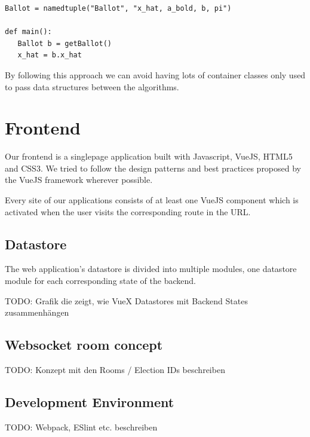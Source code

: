 \begin{verbatim}
Ballot = namedtuple("Ballot", "x_hat, a_bold, b, pi")

def main():
   Ballot b = getBallot()
   x_hat = b.x_hat
\end{verbatim}

By following this approach we can avoid having lots of container classes only used to pass data structures between the algorithms.

\section{Frontend}
Our frontend is a singlepage application built with Javascript, VueJS, HTML5 and CSS3. We tried to follow the design patterns and best practices proposed by the VueJS framework wherever possible.

Every site of our applications consists of at least one VueJS component which is activated when the user visits the corresponding route in the URL.
\subsection{Datastore}
The web application's datastore is divided into multiple modules, one datastore module for each corresponding state of the backend.

TODO: Grafik die zeigt, wie VueX Datastores mit Backend States zusammenhängen
 
\subsection{Websocket room concept}
TODO: Konzept mit den Rooms / Election IDs beschreiben

\subsection{Development Environment}
TODO: Webpack, ESlint etc. beschreiben